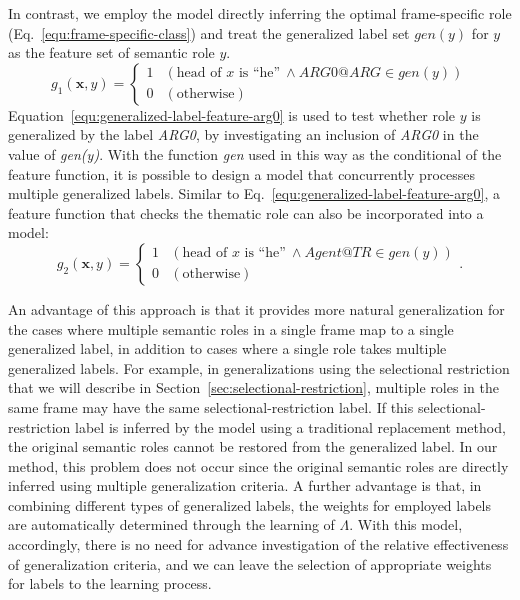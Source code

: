 \documentclass[english]{jnlp_1.4_rep}
\begin{document}
In contrast, we employ the model directly inferring the optimal frame-specific role (Eq.~\ref{equ:frame-specific-class}) and treat the generalized label set $gen(y)$ for $y$ as the feature set of semantic role $y$.
\begin{equation}
 g_1(\mathbf{x},y) =
  \begin{cases}
   1 & (\mbox{head of }x\mbox{ is ``he''}~\wedge \mathit{ARG0@ARG} \in gen(y))\\
   0 & (\mbox{otherwise})
  \end{cases}
\label{equ:generalized-label-feature-arg0}
\end{equation}
Equation~\ref{equ:generalized-label-feature-arg0} is used to test whether role $y$ is generalized by the label {\it ARG0}, by investigating an inclusion of {\it ARG0} in the value of {\it gen(y)}.
With the function {\it gen} used in this way as the conditional of the feature function, it is possible to design a model that concurrently processes multiple generalized labels. Similar to Eq.~\ref{equ:generalized-label-feature-arg0}, a feature function that checks the thematic role can also be incorporated into a model:
\begin{equation}
 g_2(\mathbf{x},y) =
  \begin{cases}
   1 & (\mbox{head of }x\mbox{ is ``he''}~\wedge
      \mathit{Agent@TR} \in gen(y))\\
   0 & (\mbox{otherwise})
  \end{cases}.
\label{equ:generalized-label-feature-agent}
\end{equation}

An advantage of this approach is that it provides more natural generalization
for the cases where multiple semantic roles in a single frame map to a single generalized label, in addition to cases where a single role takes multiple generalized labels.
For example, in generalizations using the selectional restriction that we will describe in Section~\ref{sec:selectional-restriction},  multiple roles in the same frame may have the same selectional-restriction label. If this selectional-restriction label is inferred by the model using a traditional replacement method, the original semantic roles cannot be restored from the generalized label. In our method, this problem does not occur since the original semantic roles are directly inferred using multiple generalization criteria. A further advantage is that, in combining different types of generalized labels, the weights for employed labels are automatically determined through the learning of $\Lambda$. With this model, accordingly, there is no need for advance investigation of the relative effectiveness of generalization criteria, and we can leave the selection of appropriate weights for labels to the learning process.
\end{document}
